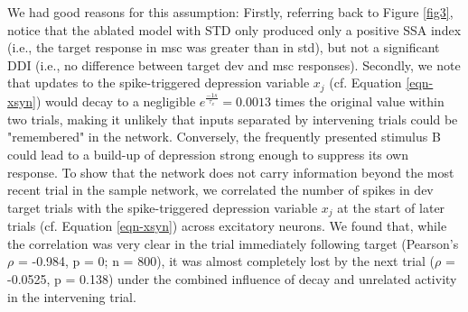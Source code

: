 \documentclass[pdflatex,referee,iicol,sn-basic]{sn-jnl}
\theoremstyle{thmstyleone}%
\theoremstyle{thmstyletwo}%
\theoremstyle{thmstylethree}%
\begin{document}
We had good reasons for this assumption: Firstly, referring back to Figure \ref{fig3}, notice that the ablated model with STD only produced only a positive SSA index (i.e., the target response in msc was greater than in std), but not a significant DDI (i.e., no difference between target dev and msc responses). Secondly, we note that updates to the spike-triggered depression variable $x_j$ (cf. Equation \ref{eqn-xsyn}) would decay to a negligible $e^\frac{-1 s}{\tau_x} = 0.0013$ times the original value within two trials, making it unlikely that inputs separated by intervening trials could be "remembered" in the network. Conversely, the frequently presented stimulus B could lead to a build-up of depression strong enough to suppress its own response.
To show that the network does not carry information beyond the most recent trial in the sample network, we correlated the number of spikes in dev target trials with the spike-triggered depression variable $x_j$ at the start of later trials (cf. Equation \ref{eqn-xsyn}) across excitatory neurons. We found that, while the correlation was very clear in the trial immediately following target (Pearson's $\rho$ = -0.984, p = 0; n = 800), it was almost completely lost by the next trial ($\rho$ = -0.0525, p = 0.138) under the combined influence of decay and unrelated activity in the intervening trial.
\end{document}
